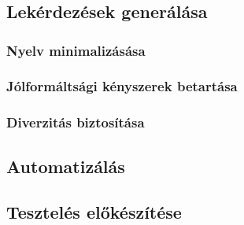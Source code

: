 \chapter*{\ellaboration}

\section{Lekérdezések generálása}

\subsection{Nyelv minimalizásása}
\subsection{Jólformáltsági kényszerek betartása}
\subsection{Diverzitás biztosítása}


\section{Automatizálás}

\section{Tesztelés előkészítése}
